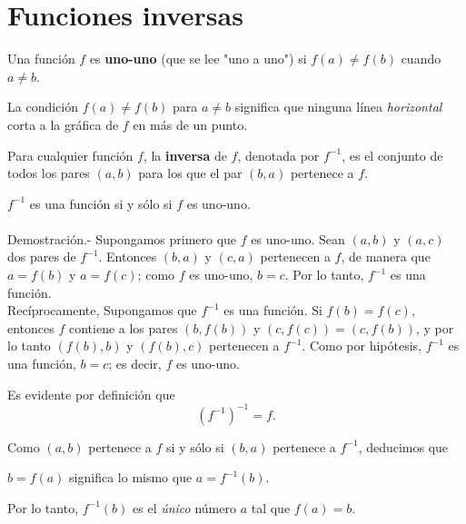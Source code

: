 \chapter{Funciones inversas}

\begin{def.}
    Una función $f$ es \textbf{uno-uno} (que se lee "uno a uno") si $f(a)\neq f(b)$ cuando $a\neq b$.
\end{def.}
\vspace{0.3cm}
La condición $f(a)\neq f(b)$ para $a\neq b$ significa que ninguna línea \textit{horizontal} corta a la gráfica de $f$ en más de un punto.

\begin{def.}
    Para cualquier función $f$, la \textbf{inversa} de $f$, denotada por $f^{-1}$, es el conjunto de todos los pares $(a,b)$ para los que el par $(b,a)$ pertenece a $f$.
\end{def.}

\begin{teo}
    $f^{-1}$ es una función si y sólo si $f$ es uno-uno.\\\\
	Demostración.-\; Supongamos primero que $f$ es uno-uno. Sean $(a,b)$ y $(a,c)$ dos pares de $f^{-1}$. Entonces $(b,a)$ y $(c,a)$ pertenecen a $f$, de manera que $a=f(b)$ y $a=f(c)$; como $f$ es uno-uno, $b=c$. Por lo tanto, $f^{-1}$ es una función.\\
	Recíprocamente, Supongamos que $f^{-1}$ es una función. Si $f(b)=f(c)$, entonces $f$ contiene a los pares $\left(b,f(b)\right)$ y $\left(c,f(c)\right)=\left(c,f(b)\right)$, y por lo tanto $\left(f(b),b\right)$ y $\left(f(b),c\right)$ pertenecen a $f^{-1}$. Como por hipótesis, $f^{-1}$ es una función, $b=c$; es decir, $f$ es uno-uno.
\end{teo}
\vspace{0.3cm}
Es evidente por definición que 
$$\left(f^{-1}\right)^{-1}=f.$$

Como $(a,b)$ pertenece a $f$ si y sólo si $(b,a)$ pertenece a $f^{-1}$, deducimos que

\begin{center}
    $b=f(a)$ significa lo mismo que $a=f^{-1}(b).$
\end{center}

Por lo tanto, $f^{-1}(b)$ es el \textit{único} número $a$ tal que $f(a)=b$.\\\\

